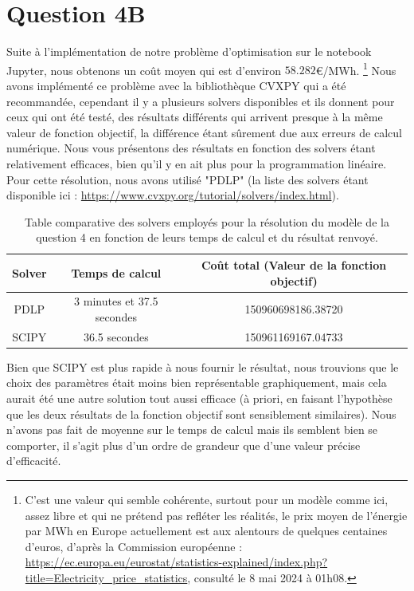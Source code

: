 \documentclass{article}
\begin{document}
\section*{Question 4B}
Suite à l'implémentation de notre problème d'optimisation sur le notebook Jupyter, nous obtenons 
un coût moyen qui est d'environ $\mathbf{58.282}$\euro/MWh. \footnote{C'est une valeur qui semble cohérente, surtout pour un modèle comme ici, 
assez libre et qui ne prétend pas refléter les réalités, le prix moyen de l'énergie par MWh en Europe actuellement 
est aux alentours de quelques centaines d'euros, d'après la Commission européenne : 
\url{https://ec.europa.eu/eurostat/statistics-explained/index.php?title=Electricity_price_statistics}, 
consulté le 8 mai 2024 à 01h08.} Nous avons implémenté ce problème avec la bibliothèque CVXPY qui a été recommandée, cependant
il y a plusieurs solvers disponibles et ils donnent pour ceux qui ont été testé, des résultats différents qui arrivent presque à
la même valeur de fonction objectif, la différence étant sûrement due aux erreurs de calcul numérique. Nous vous présentons des résultats 
en fonction des solvers étant relativement efficaces, bien qu'il y en ait plus pour la programmation linéaire. Pour cette résolution,
nous avons utilisé "PDLP" (la liste des solvers étant disponible ici : \url{https://www.cvxpy.org/tutorial/solvers/index.html}).

\begin{table}[h!]
    \centering
    \renewcommand{\arraystretch}{1.5}%
    \begin{tabular}{| c | c | c |} 
        \hline
        Solver & Temps de calcul & Coût total (Valeur de la fonction objectif) \\
        \hline
        PDLP & 3 minutes et 37.5 secondes & 150960698186.38720 \\
        SCIPY & 36.5 secondes & 150961169167.04733 \\
        \hline
    \end{tabular}
    \caption{Table comparative des solvers employés pour la résolution du modèle de la question 4 en fonction de leurs temps de calcul
    et du résultat renvoyé.}
    \label{table:comparaison_solver_Q4}
\end{table}
\noindent
Bien que SCIPY est plus rapide à nous fournir le résultat, nous trouvions que le choix des paramètres était moins bien représentable
graphiquement, mais cela aurait été une autre solution tout aussi efficace (à priori, en faisant l'hypothèse que les deux résultats de la fonction objectif 
sont sensiblement similaires). Nous n'avons pas fait de moyenne sur le temps de calcul mais 
ils semblent bien se comporter, il s'agit plus d'un ordre de grandeur que d'une valeur précise d'efficacité.
\end{document}
